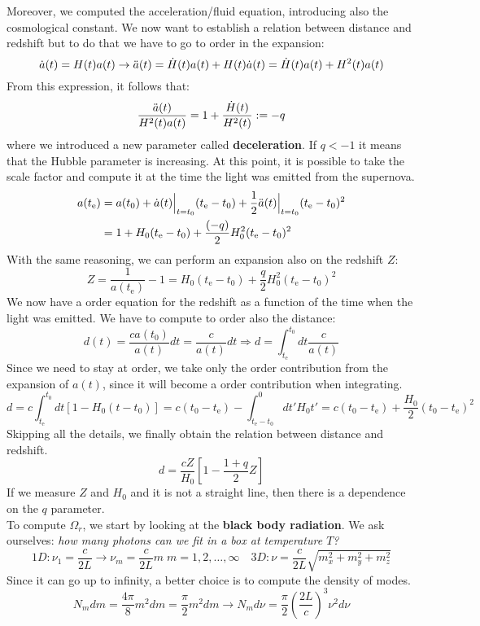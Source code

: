 \documentclass[10.75pt,a4paper,openright,bottom=2cm]{article}
\begin{document}
Moreover, we computed the acceleration/fluid equation, introducing also the cosmological constant. We now want to establish a relation between distance and redshift but to do that we have to go to  order in the expansion:
\[
\Dot{a}(t)=H(t)a(t)\to\Ddot{a}(t)=\Dot{H}(t)a(t)+H(t)\Dot{a}(t)=\Dot{H}(t)a(t)+H^2(t)a(t)
\]
From this expression, it follows that:
\[
\frac{\Ddot{a}(t)}{H^2(t)a(t)}=1+\frac{\Dot{H}(t)}{H^2(t)}:=-q
\]
where we introduced a new parameter called \textbf{deceleration}. If $q<-1$ it means that the Hubble parameter is increasing. At this point, it is possible to take the scale factor and compute it at the time the light was emitted from the supernova.
\[
\begin{aligned}
a(t_{\text{e}})&=a(t_0)+\Dot{a}(t)\Bigr|_{\substack{t=t_0}}(t_{\text{e}}-t_0)+\frac{1}{2}\Ddot{a}(t)\Bigr|_{\substack{t=t_0}}(t_{\text{e}}-t_0)^2\\
&=1+H_0(t_{\text{e}}-t_0)+\frac{(-q)}{2}H_0^2(t_{\text{e}}-t_0)^2
\end{aligned}
\]
With the same reasoning, we can perform an expansion also on the redshift $Z$:
\[
Z=\frac{1}{a(t_{\text{e}})}-1=H_0(t_{\text{e}}-t_0)+\frac{q}{2}H_0^2(t_{\text{e}}-t_0)^2
\]
We now have a  order equation for the redshift as a function of the time when the light was emitted. We have to compute to  order also the distance:
\[
d(t)=\frac{ca(t_0)}{a(t)}dt=\frac{c}{a(t)}dt\Rightarrow d=\int_{t_{\text{e}}}^{t_0}dt\frac{c}{a(t)}
\]
Since we need to stay at  order, we take only the  order contribution from the expansion of $a(t)$, since it will become a  order contribution when integrating.
\[
d=c\int_{t_{\text{e}}}^{t_0}dt[1-H_0(t-t_0)]=c(t_0-t_{\text{e}})-\int_{t_{\text{e}}-t_0}^{0}dt'H_0t'=c(t_0-t_{\text{e}})+\frac{H_0}{2}(t_0-t_{\text{e}})^2
\]
Skipping all the details, we finally obtain the relation between distance and redshift.
\[
d=\frac{cZ}{H_0}\left[1-\frac{1+q}{2}Z\right]
\]
If we measure $Z$ and $H_0$ and it is not a straight line, then there is a dependence on the $q$ parameter.\\
To compute $\Omega_r$, we start by looking at the \textbf{black body radiation}. We ask ourselves: \textit{how many photons can we fit in a box at temperature $T$?}
\[
1D: \nu_1=\frac{c}{2L}\to\nu_m=\frac{c}{2L}m\;m=1,2,\dots,\infty \quad 3D: \nu=\frac{c}{2L}\sqrt{m_x^2+m_y^2+m_z^2}
\]
Since it can go up to infinity, a better choice is to compute the density of modes.
\[
N_mdm=\frac{4\pi}{8}m^2dm=\frac{\pi}{2}m^2dm\to N_md\nu=\frac{\pi}{2}\left(\frac{2L}{c}\right)^3\nu^2d\nu
\]
\end{document}
